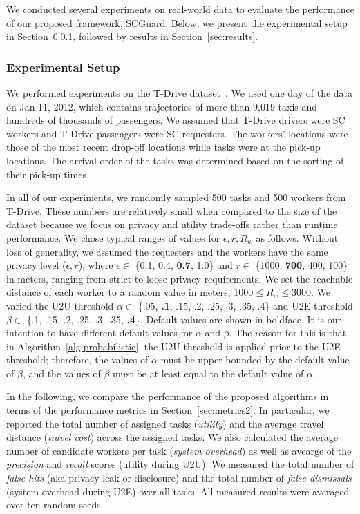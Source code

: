 \documentclass{USC-Thesis}
\numberwithin{equation}{chapter}
\begin{document}
We conducted several experiments on real-world data to evaluate the performance of our proposed framework, SCGuard. Below, we present the experimental setup in Section~\ref{sec:methodology}, followed by results in Section~\ref {sec:results}.

\subsubsection{Experimental Setup}
\label{sec:methodology}
We performed experiments on the T-Drive dataset~\cite{yuan2010t}. We used one day of the data on Jan 11, 2012, which contains trajectories of more than 9,019 taxis and hundreds of thousands of passengers. We assumed that T-Drive drivers were SC workers and T-Drive passengers were SC requesters. The workers' locations were those of the most recent drop-off locations while tasks were at the pick-up locations. The arrival order of the tasks was determined based on the sorting of their pick-up times.

In all of our experiments, we randomly sampled 500 tasks and 500 workers from T-Drive. These numbers are relatively small when compared to the size of the dataset because we focus on privacy and utility trade-offs rather than runtime performance.
We chose typical ranges of values for $\epsilon,r,R_w$ as follows. Without loss of generality, we assumed the requesters and the workers have the same privacy level ($\epsilon,r$), where $\epsilon \in$ \{0.1, 0.4, \textbf{0.7}, 1.0\} and $r \in$ \{1000, \textbf{700}, 400, 100\} in meters, ranging from strict to loose privacy requirements.
We set the reachable distance of each worker to a random value in meters, 1000$\le R_w\le$3000.
We varied the U2U threshold $\alpha \in$ \{.05, \textbf{.1}, .15, .2, .25, .3, .35, .4\} and U2E threshold $\beta \in$ \{.1, .15, .2, .25, .3, .35, \textbf{.4}\}.
Default values are shown in boldface. It is our intention to have different default values for $\alpha$ and $\beta$. The reason for this is that, in Algorithm~\ref{alg:probabilistic}, the U2U threshold is applied prior to the U2E threshold; therefore, the values of $\alpha$ must be upper-bounded by the default value of $\beta$, and the values of $\beta$ must be at least equal to the default value of $\alpha$.

In the following, we compare the performance of the proposed algorithms in terms of the performance metrics in Section~\ref{sec:metrics2}. In particular, we reported the total number of assigned tasks (\emph{utility}) and the average travel distance (\emph{travel cost}) across the assigned tasks. We also calculated the average number of candidate workers per task (\emph{system overhead}) as well as avearge of the \emph{precision} and \emph{recall} scores (utility during U2U). We measured the total number of \emph{false hits} (aka privacy leak or disclosure) and the total number of \emph{false dismissals} (system overhead during U2E) over all tasks.
All measured results were averaged over ten random seeds.
\end{document}
